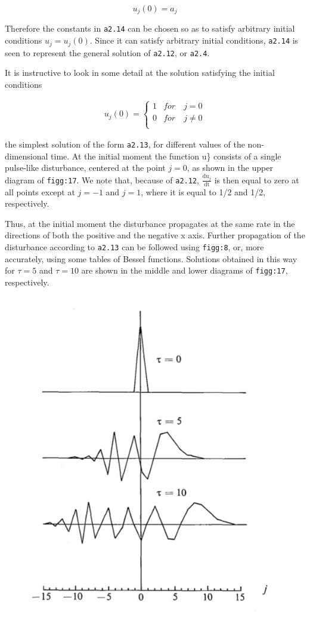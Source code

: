  \[u_{j}\left( 0 \right) = a_{j}\]

Therefore the constants in \texttt{a2.14} can be chosen so as to satisfy
arbitrary initial conditions \(u_{j} = u_{j}\left( 0 \right)\). Since it
can satisfy arbitrary initial conditions, \texttt{a2.14} is seen to
represent the general solution of \texttt{a2.12}, or \texttt{a2.4}.

It is instructive to look in some detail at the solution satisfying the
initial conditions

 \[\begin{aligned}
     u_{j}\left( 0 \right) = \left\{ \begin{array}{cc}
                                      1  &  for \quad j = 0\\
                                      0  &  for \quad j \neq 0\\
     \end{array} \right.
\end{aligned}\]

the simplest solution of the form \texttt{a2.13}, for different values
of the non-dimensional time. At the initial moment the function u\}
consists of a single pulse-like disturbance, centered at the point
\(j = 0\), as shown in the upper diagram of \texttt{figg:17}. We note
that, because of \texttt{a2.12}, \(\frac{\text{du}_{j}}{\text{dt}}\) is
then equal to zero at all points except at \(j = - 1\) and \(j = 1\),
where it is equal to 1/2 and 1/2, respectively.

Thus, at the initial moment the disturbance propagates at the same rate
in the directions of both the positive and the negative x axis. Further
propagation of the disturbance according to \texttt{a2.13} can be
followed using \texttt{figg:8}, or, more accurately, using some tables
of Bessel functions. Solutions obtained in this way for \(\tau = 5\) and
\(\tau = 10\) are shown in the middle and lower diagrams of
\texttt{figg:17}, respectively.

\begin{figure}
 \centering
 \includegraphics[width = .7 \textwidth]{figs/NM/pic17.jpg}
 \caption{} \label{fig:}
\end{figure}

